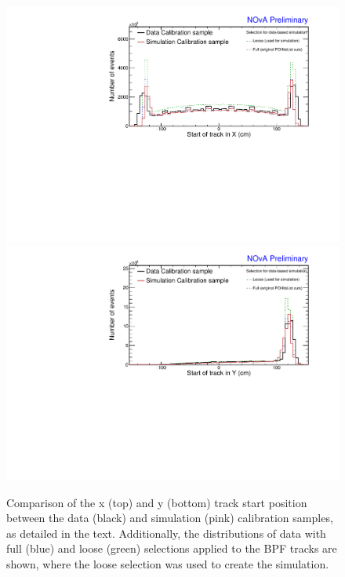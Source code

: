 \begin{figure}[!ht]
\includegraphics[width=\textwidth]{Plots/TBCalibration/DBSim_DataMCComparison_StartX.pdf}
\includegraphics[width=\textwidth]{Plots/TBCalibration/DBSim_DataMCComparison_StartY.pdf}
\caption[Data-Simulation comparison of track start X and Y distributions]{Comparison of the x (top) and y (bottom) track start position between the data (black) and simulation (pink) calibration samples, as detailed in the text. Additionally, the distributions of data with full (blue) and loose (green) selections applied to the \acrshort{BPF} tracks are shown, where the loose selection was used to create the simulation.}
\label{fig:DataBasedSimDataMCComparison_startXstartY}
\end{figure}

